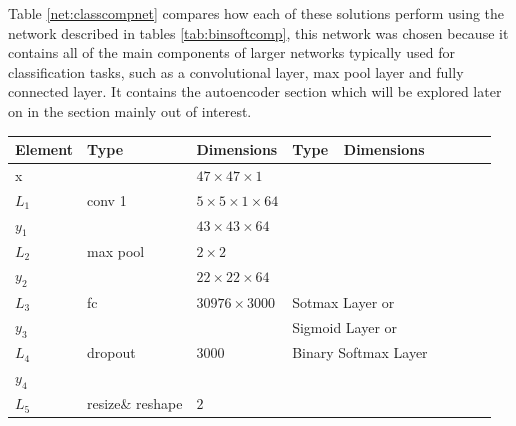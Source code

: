    Table \ref{net:classcompnet} compares how each of these solutions perform using the network described in
    tables \ref{tab:binsoftcomp}, this network was chosen because it contains all of the main
    components of larger networks typically used for classification tasks, such as a convolutional
    layer, max pool layer and fully connected layer. It contains the autoencoder section which will be
    explored later on in the section mainly out of interest.

    \begin{table}[h!]
    \centering
    {\footnotesize
    \begin{tabular}{|lllllllll|}
    \hline
    \multicolumn{1}{|l|}{Element} & Type     & \multicolumn{1}{l|}{Dimensions}                     & Type     & \multicolumn{1}{l|}{Dimensions} \\ \hline
    \multicolumn{1}{|l|}{x}       &          & \multicolumn{1}{l|}{$47\times47\times1$}            &          & \multicolumn{1}{l|}{}          \\ \hline
    \multicolumn{1}{|l|}{$L_1$}   & conv 1   & \multicolumn{1}{l|}{$5\times 5\times1\times 64$}    &          & \multicolumn{1}{l|}{}          \\
    \multicolumn{1}{|l|}{$y_1$}   &          & \multicolumn{1}{l|}{$43\times43\times64$}           &          & \multicolumn{1}{l|}{}          \\ \hline
    \multicolumn{1}{|l|}{$L_2$}   & max pool & \multicolumn{1}{l|}{$2\times 2$}                    &          & \multicolumn{1}{l|}{}          \\
    \multicolumn{1}{|l|}{$y_2$}   &          & \multicolumn{1}{l|}{$22\times22\times 64$}          &          & \multicolumn{1}{l|}{}          \\ \hline
    \multicolumn{1}{|l|}{$L_3$}   & fc       & \multicolumn{1}{l|}{$30976\times3000$}              & \multicolumn{2}{l|}{Sotmax Layer or}      \\
    \multicolumn{1}{|l|}{$y_3$}   &          & \multicolumn{1}{l|}{}                               & \multicolumn{2}{l|}{Sigmoid Layer or}     \\
    \multicolumn{1}{|l|}{$L_4$}   & dropout  & \multicolumn{1}{l|}{$3000$}                         & \multicolumn{2}{l|}{Binary Softmax Layer} \\
    \multicolumn{1}{|l|}{$y_4$}   &          & \multicolumn{1}{l|}{}                               &          & \multicolumn{1}{l|}{}          \\ \hline
    \multicolumn{1}{|l|}{$L_5$}   & resize\& reshape & \multicolumn{1}{l|}{$2$}                    &          & \multicolumn{1}{l|}{}          \\

\end{tabular}}
\end{table}
